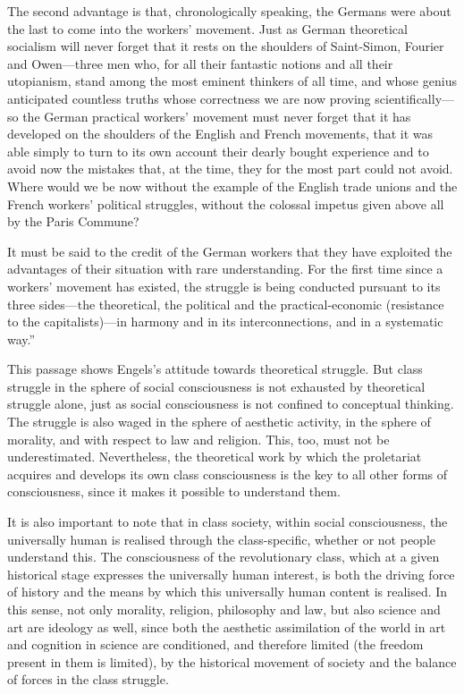 \documentclass[12pt,a4paper,openany]{book}
\begin{document}
The second advantage is that, chronologically speaking, the Germans were about the last to come into the workers’ movement. Just as German theoretical socialism will never forget that it rests on the shoulders of Saint-Simon, Fourier and Owen—three men who, for all their fantastic notions and all their utopianism, stand among the most eminent thinkers of all time, and whose genius anticipated countless truths whose correctness we are now proving scientifically—so the German practical workers’ movement must never forget that it has developed on the shoulders of the English and French movements, that it was able simply to turn to its own account their dearly bought experience and to avoid now the mistakes that, at the time, they for the most part could not avoid. Where would we be now without the example of the English trade unions and the French workers’ political struggles, without the colossal impetus given above all by the Paris Commune?

It must be said to the credit of the German workers that they have exploited the advantages of their situation with rare understanding. For the first time since a workers’ movement has existed, the struggle is being conducted pursuant to its three sides—the theoretical, the political and the practical-economic (resistance to the capitalists)—in harmony and in its interconnections, and in a systematic way.”

This passage shows Engels’s attitude towards theoretical struggle. But class struggle in the sphere of social consciousness is not exhausted by theoretical struggle alone, just as social consciousness is not confined to conceptual thinking. The struggle is also waged in the sphere of aesthetic activity, in the sphere of morality, and with respect to law and religion. This, too, must not be underestimated. Nevertheless, the theoretical work by which the proletariat acquires and develops its own class consciousness is the key to all other forms of consciousness, since it makes it possible to understand them.

It is also important to note that in class society, within social consciousness, the universally human is realised through the class-specific, whether or not people understand this. The consciousness of the revolutionary class, which at a given historical stage expresses the universally human interest, is both the driving force of history and the means by which this universally human content is realised. In this sense, not only morality, religion, philosophy and law, but also science and art are ideology as well, since both the aesthetic assimilation of the world in art and cognition in science are conditioned, and therefore limited (the freedom present in them is limited), by the historical movement of society and the balance of forces in the class struggle.
\end{document}
